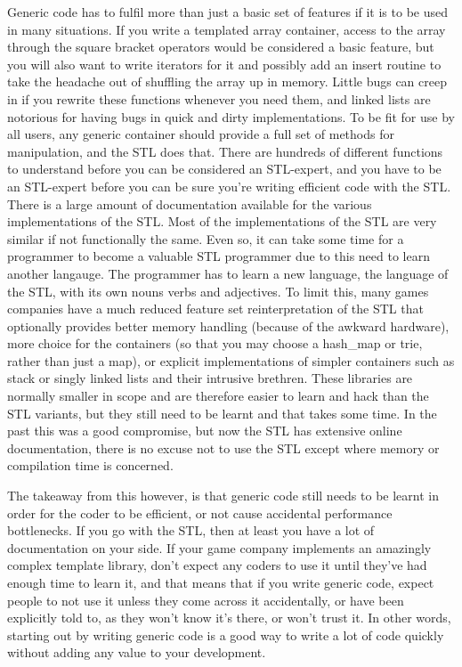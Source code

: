 Generic code has to fulfil more than just a basic set of features if it is to
be used in many situations. If you write a templated array container, access to
the array through the square bracket operators would be considered a basic
feature, but you will also want to write iterators for it and possibly add an
insert routine to take the headache out of shuffling the array up in memory.
Little bugs can creep in if you rewrite these functions whenever you need them,
and linked lists are notorious for having bugs in quick and dirty
implementations. To be fit for use by all users, any generic container should
provide a full set of methods for manipulation, and the STL does that. There
are hundreds of different functions to understand before you can be considered
an STL-expert, and you have to be an STL-expert before you can be sure you're
writing efficient code with the STL. There is a large amount of documentation
available for the various implementations of the STL. Most of the
implementations of the STL are very similar if not functionally the same. Even
so, it can take some time for a programmer to become a valuable STL programmer
due to this need to learn another langauge. The programmer has to learn a new
language, the language of the STL, with its own nouns verbs and adjectives. To
limit this, many games companies have a much reduced feature set
reinterpretation of the STL that optionally provides better memory handling
(because of the awkward hardware), more choice for the containers (so that you
may choose a hash\_map or trie, rather than just a map), or explicit
implementations of simpler containers such as stack or singly linked lists and
their intrusive brethren. These libraries are normally smaller in scope and are
therefore easier to learn and hack than the STL variants, but they still need
to be learnt and that takes some time. In the past this was a good compromise,
but now the STL has extensive online documentation, there is no excuse not to
use the STL except where memory or compilation time is concerned.

The takeaway from this however, is that generic code still needs to be learnt
in order for the coder to be efficient, or not cause accidental performance
bottlenecks. If you go with the STL, then at least you have a lot of
documentation on your side. If your game company implements an amazingly
complex template library, don't expect any coders to use it until they've had
enough time to learn it, and that means that if you write generic code, expect
people to not use it unless they come across it accidentally, or have been
explicitly told to, as they won't know it's there, or won't trust it. In other
words, starting out by writing generic code is a good way to write a lot of
code quickly without adding any value to your development.

